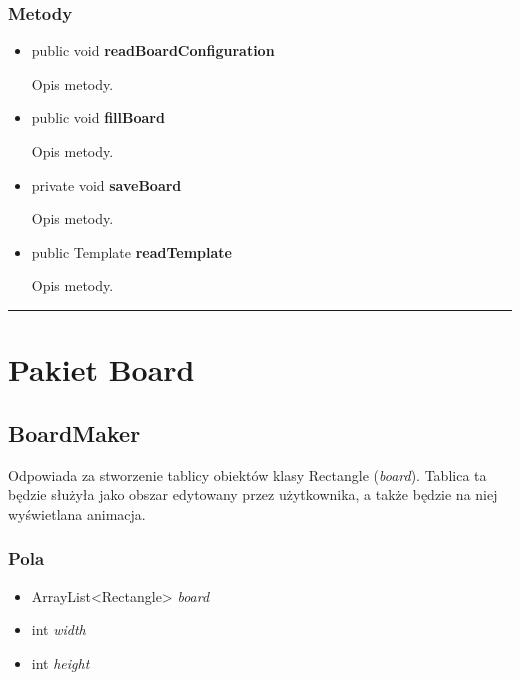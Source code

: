 \documentclass[a4paper,11pt]{article}
\newcommand{\linia}{\rule{\linewidth}{0.4mm}}
\begin{document}
\subsubsection{Metody}
\begin{itemize}
\item public void \textbf{readBoardConfiguration}

Opis metody.
\item public void \textbf{fillBoard}

Opis metody.
\item private void \textbf{saveBoard}

Opis metody.
\item public Template \textbf{readTemplate}

Opis metody.
\end{itemize}

\noindent\linia

\section{Pakiet Board}

\subsection{BoardMaker}
Odpowiada za stworzenie tablicy obiektów klasy Rectangle (\textit{board}). Tablica ta będzie służyła jako obszar edytowany przez użytkownika, a także będzie na niej wyświetlana animacja.
\subsubsection{Pola}
\begin{itemize}
\item ArrayList<Rectangle> \textit{board}
\item int \textit{width}
\item int \textit{height}
\end{itemize}
\end{document}
